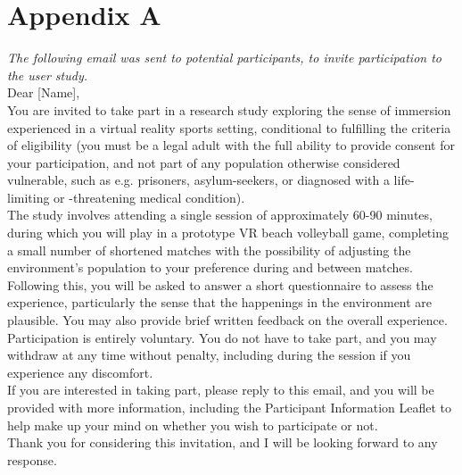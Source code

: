 \chapter*{Appendix A}
\label{app::recruitment-doc}

\textit{The following email was sent to potential participants, to invite participation to the user study.}\\

Dear [Name],\\
You are invited to take part in a research study exploring the sense of immersion experienced in a virtual reality sports setting, conditional to fulfilling the criteria of eligibility (you must be a legal adult with the full ability to provide consent for your participation, and not part of any population otherwise considered vulnerable, such as e.g. prisoners, asylum-seekers, or diagnosed with a life-limiting or -threatening medical condition).\\
The study involves attending a single session of approximately 60-90 minutes, during which you will play in a prototype VR beach volleyball game, completing a small number of shortened matches with the possibility of adjusting the environment's population to your preference during and between matches. Following this, you will be asked to answer a short questionnaire to assess the experience, particularly the sense that the happenings in the environment are plausible. You may also provide brief written feedback on the overall experience. \\
Participation is entirely voluntary. You do not have to take part, and you may withdraw at any time without penalty, including during the session if you experience any discomfort.\\

If you are interested in taking part, please reply to this email, and you will be provided with more information, including the Participant Information Leaflet to help make up your mind on whether you wish to participate or not.\\

Thank you for considering this invitation, and I will be looking forward to any response.
